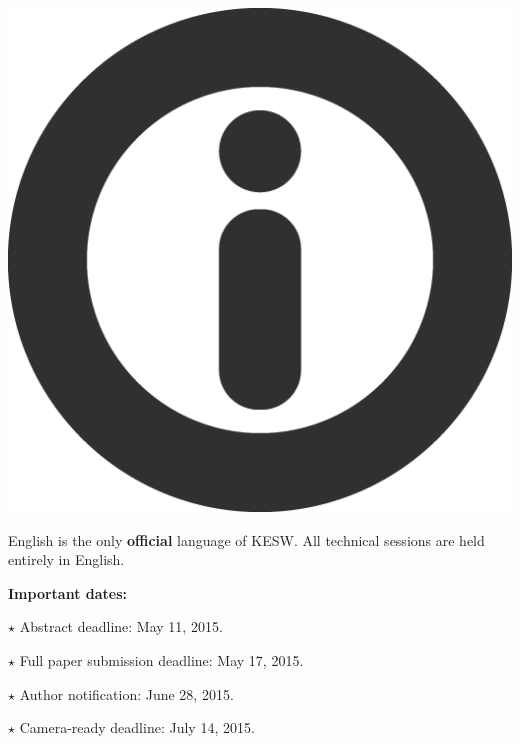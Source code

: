 \documentclass[a4paper, 10pt]{article}
\renewcommand{\skip}{\vspace{1ex}}
\renewcommand{\bullet}{\ensuremath{\star} }
\begin{document}
\skip\skip

\begin{minipage}{.10\textwidth}
\includegraphics[width=\textwidth]{information}
\end{minipage}
\hfill
\begin{minipage}{.82\textwidth}
English is the only \textbf{official} language of KESW. All technical sessions
are held entirely in English.
\end{minipage}

\skip\skip

\noindent\textbf{Important dates:}

\skip

\noindent
\bullet Abstract deadline: May 11, 2015.

\noindent
\bullet Full paper submission deadline: May 17, 2015.

\noindent
\bullet Author notification: June 28, 2015.

\noindent
\bullet Camera-ready deadline: July 14, 2015.

\skip
\end{document}
